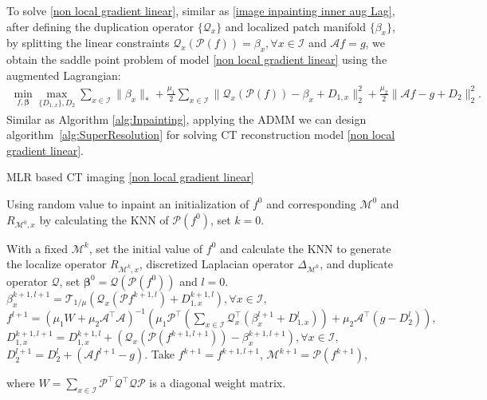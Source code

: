 \documentclass[letterpaper,10pt]{article}
\begin{document}
To solve \eqref{non local gradient linear}, similar as \eqref{image inpainting inner aug Lag}, after defining the duplication operator $\{\mathcal{Q}_x\}$ and localized patch manifold $\{\beta_x\}$, by splitting the linear constraints $\mathcal{Q}_x(\mathcal{P}(f)) = \beta_x, \forall x \in \mathscr{I}$ and $\mathcal{A}f = g$, we obtain  the saddle point problem of model \eqref{non local gradient linear} using the augmented Lagrangian:
\begin{equation}\label{image  Super Resolution inner Empi aug Lag}
\begin{split}
\min_{f,\bm{\beta}}\max_{\{D_{1,x}\},D_2} \sum_{x \in \mathscr{I}} \|{\beta}_x\|_* + \frac{\mu_1}{2} \sum_{x \in \mathscr{I}} \|\mathcal{Q}_x (\mathcal{P} (f)) - {\beta}_x + D_{1,x}\|_2^2 + \frac{\mu_2}{2} \|\mathcal{A} f    -  g +D_2 \|_2^2.
\end{split}
\end{equation}
Similar as Algorithm \ref{alg:Inpainting}, applying the ADMM we can design algorithm~\ref{alg:SuperResolution} for solving CT reconstruction model \eqref{non local gradient linear}.

\begin{algorithm}

\caption{MLR based CT imaging \eqref{non local gradient linear} }
\label{alg:SuperResolution}
\begin{algorithmic}

 Using random value to inpaint an initialization of $f^0$ and corresponding $\mathcal{M}^0$ and $R_{\mathcal{M}^0,x}$ by calculating the KNN of $\mathcal{P}(f^0)$, set $k=0$.

 With a fixed $\mathcal{M}^k$, set the initial value of $f^0$ and calculate the KNN to generate the localize operator $R_{\mathcal{M}^k,x}$, discretized Laplacian operator $\Delta_{\mathcal{M}^k}$, and duplicate operator $\mathcal{Q}$, set $\bm{\beta}^0 = \mathcal{Q} (\mathcal{P} (f^0))$ and $l=0$.
  $\beta_x^{k+1,l+1} = \mathcal{T}_{1/\mu} (\mathcal{Q}_x (\mathcal{P} f^{k+1,l}) +D_{1,x}^{k+1,l}), \forall x \in \mathscr{I},$
 $f^{l+1} = (\mu_1 W + \mu_2 \mathcal{A}^{\top} \mathcal{A})^{-1}(\mu_1 \mathcal{P}^{\top} (\sum_{x \in \mathscr{I}}  {\mathcal{Q}_x^{\top}}({\beta}_x^{l+1} +D_{1,x}^{l}))+\mu_2 \mathcal{A}^{\top} (g - D_2^l)),$
 $D_{1,x}^{k+1,l+1} = D_{1,x}^{k+1,l} + (\mathcal{Q}_x(\mathcal{P}(f^{k+1,l+1}))-\beta_x^{k+1,l+1}), \forall x \in \mathscr{I},$
 $D_2^{l+1} = D_2^{l} + (\mathcal{A} f^{l+1} - g).$
\ENDWHILE
{} Take $f^{k+1} = f^{k+1,l+1}$,
 $\mathcal{M}^{k+1} = \mathcal{P}(f^{k+1})$,
\ENDWHILE

where $W = \sum_{x \in \mathscr{I}} \mathcal{P}^{\top} \mathcal{Q}^{\top} \mathcal{Q} \mathcal{P}$ is a diagonal weight matrix.



\end{algorithmic}
\end{algorithm}
\end{document}
